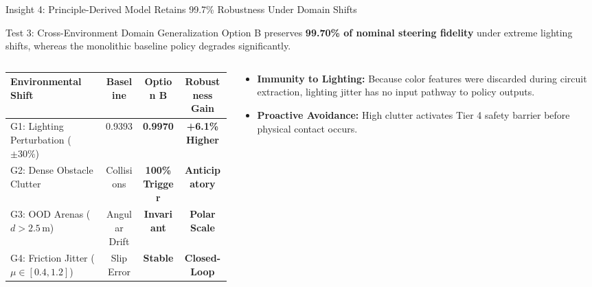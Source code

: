 \documentclass[aspectratio=169, 10pt]{beamer}
\begin{document}
\begin{frame}{Insight 4: Principle-Derived Model Retains 99.7\% Robustness Under Domain Shifts}
  \begin{block}{Test 3: Cross-Environment Domain Generalization}
    Option B preserves \textbf{99.70\% of nominal steering fidelity} under extreme lighting shifts, whereas the monolithic baseline policy degrades significantly.
  \end{block}
  \vspace{-0.2cm}
  \begin{columns}[T]
    \begin{column}{0.54\textwidth}
      \setlength{\tabcolsep}{2pt}
      \begin{table}
        \centering
        \scriptsize
        \begin{tabular}{lccc}
          \toprule
          \textbf{Environmental Shift} & \textbf{Baseline} & \textbf{Option B} & \textbf{Robustness Gain} \\
          \midrule
          G1: Lighting Perturbation ($\pm 30\%$) & 0.9393 & \textbf{0.9970} & \textbf{+6.1\% Higher} \\
          G2: Dense Obstacle Clutter & Collisions & \textbf{100\% Trigger} & \textbf{Anticipatory} \\
          G3: OOD Arenas ($d > 2.5\,\text{m}$) & Angular Drift & \textbf{Invariant} & \textbf{Polar Scale} \\
          G4: Friction Jitter ($\mu \in [0.4, 1.2]$) & Slip Error & \textbf{Stable} & \textbf{Closed-Loop} \\
          \bottomrule
        \end{tabular}
      \end{table}
    \end{column}
    \begin{column}{0.44\textwidth}
      \begin{itemize}
        \item \textbf{Immunity to Lighting:} Because color features were discarded during circuit extraction, lighting jitter has no input pathway to policy outputs.
        \item \textbf{Proactive Avoidance:} High clutter activates Tier 4 safety barrier before physical contact occurs.
      \end{itemize}
    \end{column}
  \end{columns}
\end{frame}
\end{document}

